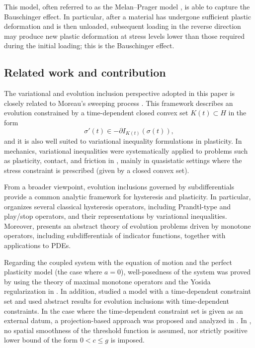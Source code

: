 \documentclass[11pt, a4paper]{article}
\newcommand{\Hs}{{H}}
\begin{document}
This model, often referred to as the Melan--Prager model \cite{Mel38,Pra35,Pra49}, is able to capture the Bauschinger effect. In particular, after a material has undergone sufficient plastic deformation and is then unloaded, subsequent loading in the reverse direction may produce new plastic deformation at stress levels lower than those required during the initial loading; this is the Bauschinger effect. 

\subsection{Related work and contribution}

The variational and evolution inclusion perspective adopted in this paper is closely related to Moreau's sweeping process \cite{Mor71,Mor77}. This framework describes an evolution constrained by a time-dependent closed convex set $K(t)\subset\Hs$ in the form
\[
    \sigma'(t)\in -\partial I_{K(t)}(\sigma(t)),
\]
and it is also well suited to variational inequality formulations in plasticity.
In mechanics, variational inequalities were systematically applied to problems such as plasticity, contact, and friction in \cite{DL76}, mainly in quasistatic settings where the stress constraint is prescribed (given by a closed convex set).

From a broader viewpoint, evolution inclusions governed by subdifferentials provide a common analytic framework for hysteresis and plasticity. 
In particular, \cite{Vis06} organizes several classical hysteresis operators, including Prandtl-type and play/stop operators, and their representations by variational inequalities.
Moreover, \cite{Sho97} presents an abstract theory of evolution problems driven by monotone operators, including subdifferentials of indicator functions, together with applications to PDEs.

Regarding the coupled system with the equation of motion and the perfect plasticity model (the case where $a=0$), well-posedness of the system was proved by using the theory of maximal monotone operators and the Yosida regularization in \cite{KC20}.
In addition, \cite{AFK23} studied a model with a time-dependent constraint set and used abstract results for evolution inclusions with time-dependent constraints.
In the case where the time-dependent constraint set is given as an external datum, a projection-based approach was proposed and analyzed in \cite{AM25}. In \cite{AM25}, no spatial smoothness of the threshold function is assumed, nor strictly positive lower bound of the form $0<c\le g$ is imposed.
\end{document}
